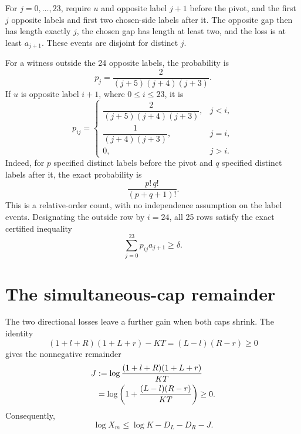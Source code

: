 \documentclass[11pt,letterpaper]{article}
\theoremstyle{remark}
\numberwithin{equation}{section}
\begin{document}
For \(j=0,\ldots,23\), require \(u\) and opposite label \(j+1\)
before the pivot, and the first \(j\) opposite labels and first two
chosen-side labels after it. The opposite gap then has length exactly
\(j\), the chosen gap has length at least two, and the loss is at
least \(a_{j+1}\). These events are disjoint for distinct \(j\).

For a witness outside the 24 opposite labels, the probability is
\begin{equation}\label{eq:outside-row}
  p_j=\frac{2}{(j+5)(j+4)(j+3)}.
\end{equation}
If \(u\) is opposite label \(i+1\), where \(0\le i\le23\), it is
\begin{equation}\label{eq:collision-rows}
  p_{ij}=\begin{cases}
    \dfrac{2}{(j+5)(j+4)(j+3)}, & j<i,\\[6pt]
    \dfrac{1}{(j+4)(j+3)}, & j=i,\\[6pt]
    0, & j>i.
  \end{cases}
\end{equation}
Indeed, for \(p\) specified distinct labels before the pivot and \(q\)
specified distinct labels after it, the exact probability is
\begin{equation}\label{eq:order-probability}
  \frac{p!\,q!}{(p+q+1)!}.
\end{equation}
This is a relative-order count, with no independence assumption on
the label events. Designating the outside row by \(i=24\), all 25
rows satisfy the exact certified inequality
\begin{equation}\label{eq:row-bound}
  \sum_{j=0}^{23}p_{ij}a_{j+1}\ge\delta.
\end{equation}

\section{The simultaneous-cap remainder}
\label{sec:joint}

The two directional losses leave a further gain when both caps shrink.
The identity
\begin{equation}\label{eq:product}
  (1+l+R)(1+L+r)-KT=(L-l)(R-r)\ge0
\end{equation}
gives the nonnegative remainder
\begin{align}
  J
  &:=\log\frac{(1+l+R)(1+L+r)}{KT}\notag\\
  &=\log\left(1+\frac{(L-l)(R-r)}{KT}\right)\ge0.
  \label{eq:joint-remainder}
\end{align}
Consequently,
\begin{equation}\label{eq:support-loss}
  \log X_m\le\log K-D_L-D_R-J.
\end{equation}
\end{document}
